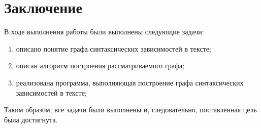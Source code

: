 \chapter*{Заключение}

В ходе выполнения работы были выполнены следующие задачи:
\begin{enumerate}[label=\arabic*)]
	\item описано понятие графа синтаксических зависимостей в тексте;
	\item описан алгоритм построения рассматриваемого графа;
	\item реализована программа, выполняющая построение графа синтаксических зависимостей в тексте;
\end{enumerate} 

Таким образом, все задачи были выполнены и, следовательно, поставленная цель была достигнута.